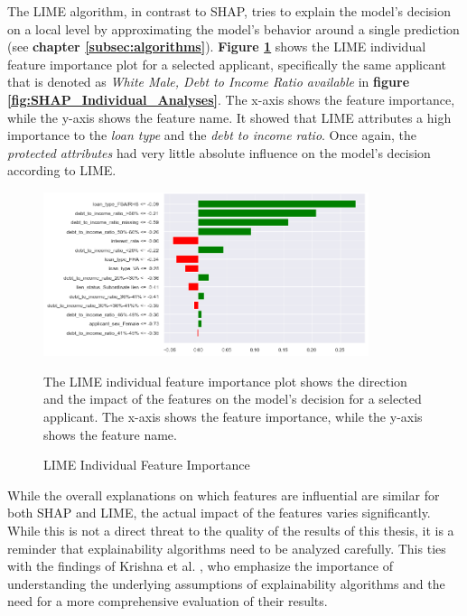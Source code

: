 The LIME algorithm, in contrast to SHAP, tries to explain the model's decision on a local level by approximating the model's behavior around a single prediction (see \textbf{chapter \ref{subsec:algorithms}}).
\textbf{Figure \ref{fig:LIME_Individual_Analyses}} shows the LIME individual feature importance plot for a selected applicant, specifically the same applicant that is denoted as \textit{White Male, Debt to Income Ratio available} in \textbf{figure \ref{fig:SHAP_Individual_Analyses}}. The x-axis shows the feature importance, while the y-axis shows the feature name.
It showed that LIME attributes a high importance to the \textit{loan type} and the \textit{debt to income ratio}. Once again, the \textit{protected attributes} had very little absolute influence on the model's decision according to LIME.

\begin{figure}[!htbp]
    \centering
    \includegraphics[width=0.85\textwidth]{images/CHXX_LIME_individual.png}
    \caption{LIME Individual Feature Importance}
    \medskip
    \small
    The LIME individual feature importance plot shows the direction and the impact of the features on the model's decision for a selected applicant. The x-axis shows the feature importance, while the y-axis shows the feature name.
    \label{fig:LIME_Individual_Analyses}
\end{figure}

While the overall explanations on which features are influential are similar for both SHAP and LIME, the actual impact of the features varies significantly. While this is not a direct threat to the quality of the results of this thesis, it is a reminder that explainability algorithms need to be analyzed carefully. 
This ties with the findings of Krishna et al. \parencite{Krishna2022}, who emphasize the importance of understanding the underlying assumptions of explainability algorithms and the need for a more comprehensive evaluation of their results.


